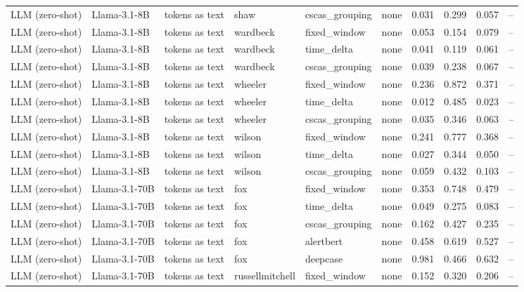 \begin{longtable}{llllllcccc}
\addlinespace
LLM (zero-shot) & Llama-3.1-8B & tokens as text & shaw & cscas\_grouping & none & 0.031 & 0.299 & 0.057 & -- \\
\addlinespace
LLM (zero-shot) & Llama-3.1-8B & tokens as text & wardbeck & fixed\_window & none & 0.053 & 0.154 & 0.079 & -- \\
\addlinespace
LLM (zero-shot) & Llama-3.1-8B & tokens as text & wardbeck & time\_delta & none & 0.041 & 0.119 & 0.061 & -- \\
\addlinespace
LLM (zero-shot) & Llama-3.1-8B & tokens as text & wardbeck & cscas\_grouping & none & 0.039 & 0.238 & 0.067 & -- \\
\addlinespace
LLM (zero-shot) & Llama-3.1-8B & tokens as text & wheeler & fixed\_window & none & 0.236 & 0.872 & 0.371 & -- \\
\addlinespace
LLM (zero-shot) & Llama-3.1-8B & tokens as text & wheeler & time\_delta & none & 0.012 & 0.485 & 0.023 & -- \\
\addlinespace
LLM (zero-shot) & Llama-3.1-8B & tokens as text & wheeler & cscas\_grouping & none & 0.035 & 0.346 & 0.063 & -- \\
\addlinespace
LLM (zero-shot) & Llama-3.1-8B & tokens as text & wilson & fixed\_window & none & 0.241 & 0.777 & 0.368 & -- \\
\addlinespace
LLM (zero-shot) & Llama-3.1-8B & tokens as text & wilson & time\_delta & none & 0.027 & 0.344 & 0.050 & -- \\
\addlinespace
LLM (zero-shot) & Llama-3.1-8B & tokens as text & wilson & cscas\_grouping & none & 0.059 & 0.432 & 0.103 & -- \\
\addlinespace
LLM (zero-shot) & Llama-3.1-70B & tokens as text & fox & fixed\_window & none & 0.353 & 0.748 & 0.479 & -- \\
\addlinespace
LLM (zero-shot) & Llama-3.1-70B & tokens as text & fox & time\_delta & none & 0.049 & 0.275 & 0.083 & -- \\
\addlinespace
LLM (zero-shot) & Llama-3.1-70B & tokens as text & fox & cscas\_grouping & none & 0.162 & 0.427 & 0.235 & -- \\
\addlinespace
LLM (zero-shot) & Llama-3.1-70B & tokens as text & fox & alertbert & none & 0.458 & 0.619 & 0.527 & -- \\
\addlinespace
LLM (zero-shot) & Llama-3.1-70B & tokens as text & fox & deepcase & none & 0.981 & 0.466 & 0.632 & -- \\
\addlinespace
LLM (zero-shot) & Llama-3.1-70B & tokens as text & russellmitchell & fixed\_window & none & 0.152 & 0.320 & 0.206 & -- \\

\end{longtable}

